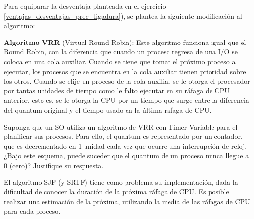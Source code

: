 \begin{questions}

\question Para equiparar la desventaja planteada en el ejercicio \ref{ventajas_desventajas_proc_ligadura}), se plantea la siguiente modificación al algoritmo:

\textbf{Algoritmo VRR} (Virtual Round Robin): Este algoritmo funciona igual que el Round Robin, con la diferencia que cuando un proceso regresa de una I/O se coloca en una cola auxiliar. Cuando se tiene que tomar el próximo proceso a ejecutar, los procesos que se encuentra en la cola auxiliar tienen prioridad sobre los otros. Cuando se elije un proceso de la cola auxiliar se le otorga el procesador por tantas unidades de tiempo como le falto ejecutar en su ráfaga de CPU anterior, esto es, se le otorga la CPU por un tiempo que surge entre la diferencia del quantum original y el tiempo usado en la última ráfaga de CPU.

\question Suponga que un SO utiliza un algoritmo de VRR con Timer Variable para el planificar sus procesos. Para ello, el quantum es representado por un contador, que es decrementado en 1 unidad cada vez que ocurre una interrupción de reloj. ¿Bajo este esquema, puede suceder que el quantum de un proceso nunca llegue a 0 (cero)? Justifique su respuesta.

\question El algoritmo SJF (y SRTF) tiene como problema su implementación, dada la dificultad de conocer la duración de la próxima ráfaga de CPU. Es posible realizar una estimación de la próxima, utilizando la media de las ráfagas de CPU para cada proceso.


\end{questions}
